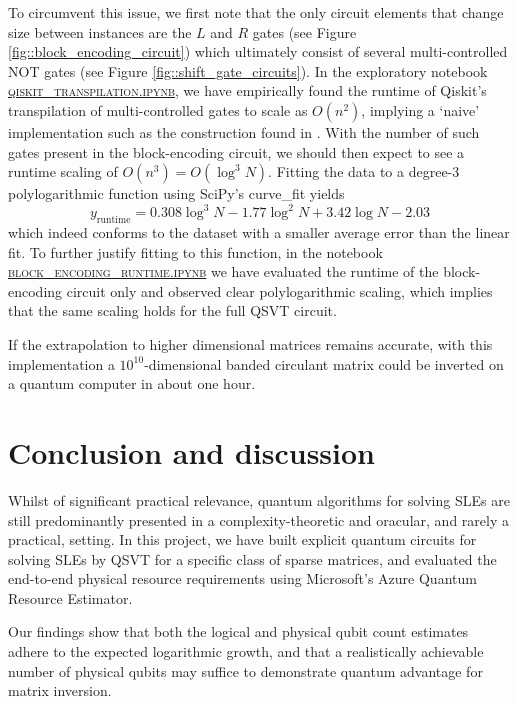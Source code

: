 \documentclass[10pt, twocolumn]{article}
\begin{document}
To circumvent this issue, we first note that the only circuit elements that change size between instances are the $L$ and $R$ gates (see Figure \ref{fig::block_encoding_circuit}) which ultimately consist of several multi-controlled \textsc{NOT} gates (see Figure \ref{fig::shift_gate_circuits}). In the exploratory notebook \href{https://github.com/Walden-Killick/QCE24-QRE-Challenge/blob/main/notebooks/exploration/qiskit_transpilation.ipynb}{\textsc{qiskit\_transpilation.ipynb}}, we have empirically found the runtime of Qiskit's transpilation of multi-controlled gates to scale as $O(n^2)$, implying a `naive' implementation such as the construction found in \cite{barenco1995elementary}. With the number of such gates present in the block-encoding circuit, we should then expect to see a runtime scaling of $O(n^3) = O(\log^3{N})$. Fitting the data to a degree-3 polylogarithmic function using SciPy's curve\_fit yields
\[
	y_\text{runtime} = 0.308 \log^3{N} - 1.77 \log^2{N} + 3.42 \log{N} - 2.03
\]
which indeed conforms to the dataset with a smaller average error than the linear fit. To further justify fitting to this function, in the notebook \href{https://github.com/Walden-Killick/QCE24-QRE-Challenge/blob/main/notebooks/results/block_encoding_runtime.ipynb}{\textsc{block\_encoding\_runtime.ipynb}} we have evaluated the runtime of the block-encoding circuit only and observed clear polylogarithmic scaling, which implies that the same scaling holds for the full QSVT circuit.

If the extrapolation to higher dimensional matrices remains accurate, with this implementation a $10^{10}$-dimensional banded circulant matrix could be inverted on a quantum computer in about one hour.

\section{Conclusion and discussion}

Whilst of significant practical relevance, quantum algorithms for solving SLEs are still predominantly presented in a complexity-theoretic and oracular, and rarely a practical, setting. In this project, we have built explicit quantum circuits for solving SLEs by QSVT for a specific class of sparse matrices, and evaluated the end-to-end physical resource requirements using Microsoft's Azure Quantum Resource Estimator.

Our findings show that both the logical and physical qubit count estimates adhere to the expected logarithmic growth, and that a realistically achievable number of physical qubits may suffice to demonstrate quantum advantage for matrix inversion.
\end{document}

